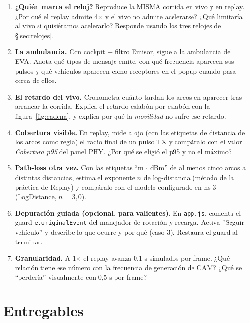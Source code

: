 \documentclass[11pt,a4paper]{article}
\begin{document}
\begin{tareabox}
\begin{enumerate}[leftmargin=1.6em, itemsep=4pt]
  \item \textbf{¿Quién marca el reloj?} Reproduce la MISMA corrida en vivo y
        en replay. ¿Por qué el replay admite 4$\times$ y el vivo no admite
        acelerarse? ¿Qué limitaría al vivo si quisiéramos acelerarlo?
        Responde usando los tres relojes de \S\ref{sec:relojes}.
  \item \textbf{La ambulancia.} Con cockpit + filtro Emisor, sigue a la
        ambulancia del EVA. Anota qué tipos de mensaje emite, con qué
        frecuencia aparecen sus pulsos y qué vehículos aparecen como
        receptores en el popup cuando pasa cerca de ellos.
  \item \label{ej:retardo}\textbf{El retardo del vivo.} Cronometra cuánto
        tardan los arcos en aparecer tras arrancar la corrida. Explica el
        retardo eslabón por eslabón con la figura~\ref{fig:cadena}, y explica
        por qué la \emph{movilidad} no sufre ese retardo.
  \item \textbf{Cobertura visible.} En replay, mide a ojo (con las etiquetas
        de distancia de los arcos como regla) el radio final de un pulso TX y
        compáralo con el valor \emph{Cobertura p95} del panel PHY. ¿Por qué se
        eligió el p95 y no el máximo?
  \item \textbf{Path-loss otra vez.} Con las etiquetas ``m $\cdot$ dBm'' de al
        menos cinco arcos a distintas distancias, estima el exponente $n$ de
        log-distancia (método de la práctica de Replay) y compáralo con el
        modelo configurado en ns-3 (LogDistance, $n=3{,}0$).
  \item \textbf{Depuración guiada (opcional, para valientes).} En
        \texttt{app.js}, comenta el guard \texttt{e.originalEvent} del
        manejador de rotación y recarga. Activa ``Seguir vehículo'' y describe
        lo que ocurre y por qué (caso 3). Restaura el guard al terminar.
  \item \textbf{Granularidad.} A 1$\times$ el replay avanza 0{,}1 s simulados
        por frame. ¿Qué relación tiene ese número con la frecuencia de
        generación de CAM? ¿Qué se ``perdería'' visualmente con 0{,}5 s por
        frame?
\end{enumerate}
\end{tareabox}

\section{Entregables}
\end{document}
